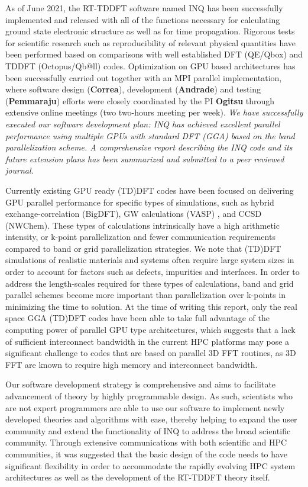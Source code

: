 As of June 2021, the RT-TDDFT software named INQ has been successfully implemented and released with all of the functions necessary for calculating ground state electronic structure as well as for time propagation. Rigorous tests for scientific research such as reproducibility of relevant physical quantities have been performed based on comparisons with well established DFT (QE/Qbox) and TDDFT (Octopus/Qb@ll) codes. Optimization on GPU based architectures has been successfully carried out together with an MPI parallel implementation, where software design ({\bf Correa}), development ({\bf Andrade}) and testing ({\bf Pemmaraju}) efforts were closely coordinated by the PI {\bf Ogitsu} through extensive online meetings (two two-hours meeting per week). \emph{ We have successfully executed our software development plan: INQ has achieved excellent parallel performance using multiple GPUs with standard DFT (GGA) based on the band parallelization scheme. A comprehensive report describing the INQ code and its future extension plans has been summarized and submitted to a peer reviewed journal.\cite{andrade2021inq}}

Currently existing GPU ready (TD)DFT codes have been focused on delivering GPU parallel performance for specific types of simulations, such as hybrid exchange-correlation (BigDFT)\cite{BigDFT2018},  GW calculations (VASP) \cite{vasp2012,vasp2012b,vasp2018,vasp2019}, and CCSD (NWChem).\cite{NWChem2013} These types of calculations intrinsically have a high arithmetic intensity, or k-point parallelization \cite{QE2017,QE2020} and fewer communication requirements compared to band or grid parallelization strategies. We note that (TD)DFT simulations of realistic materials and systems often require large system sizes in order to account for factors such as defects, impurities and interfaces. In order to address the length-scales required for these types of calculations, band and grid parallel schemes become more important than parallelization over k-points in minimizing the time to solution. At the time of writing this report, only the real space GGA (TD)DFT codes\cite{andrade2012time,andrade2013real,SparcX2021} have been able to take full advantage of the computing power of parallel GPU type architectures, which suggests that a lack of sufficient interconnect bandwidth in the current HPC platforms may pose a significant challenge to codes that are based on parallel 3D FFT routines, as 3D FFT are known to require high memory and interconnect bandwidth.\cite{heFFTe2020}

Our software development strategy is comprehensive and aims to facilitate advancement of theory by highly programmable design. As such, scientists who are not expert programmers are able to use our software to implement newly developed theories and algorithms with ease, thereby helping to expand the user community and extend the functionality of INQ to address the broad scientific community. Through extensive communications with both scientific and HPC communities, it was suggested that the basic design of the code needs to have significant flexibility in order to accommodate the rapidly evolving HPC system architectures as well as the development of the RT-TDDFT theory itself. 

